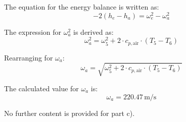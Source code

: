 The equation for the energy balance is written as:  
\[
-2 \left( h_e - h_a \right) = \omega_e^2 - \omega_a^2
\]  

The expression for \(\omega_a^2\) is derived as:  
\[
\omega_a^2 = \omega_5^2 + 2 \cdot c_{p,\text{air}} \cdot \left( T_5 - T_6 \right)
\]  

Rearranging for \(\omega_a\):  
\[
\omega_a = \sqrt{\omega_5^2 + 2 \cdot c_{p,\text{air}} \cdot \left( T_5 - T_6 \right)}
\]  

The calculated value for \(\omega_a\) is:  
\[
\omega_a = 220.47 \, \text{m/s}
\]  

No further content is provided for part c).